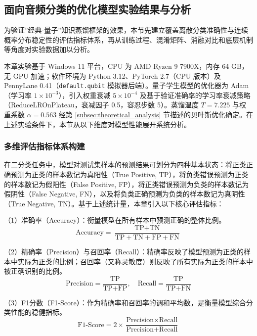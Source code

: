 \subsection{面向音频分类的优化模型实验结果与分析}
\label{sec:experimental_results}

为验证”经典-量子”知识蒸馏框架的效果，本节先建立覆盖离散分类准确性与连续概率分布稳定性的评估指标体系，再从训练过程、混淆矩阵、消融对比和底层机制等角度对实验数据加以分析。

本章实验基于 Windows 11 平台，CPU 为 AMD Ryzen 9 7900X，内存 64 GB，无 GPU 加速；软件环境为 Python 3.12、PyTorch 2.7（CPU 版本）及 PennyLane 0.41（\texttt{default.qubit} 模拟器后端）。量子学生模型的优化器为 Adam（学习率 $1\times10^{-3}$），引入权重衰减 $5\times10^{-4}$ 及基于验证准确率的学习率衰减策略（ReduceLROnPlateau，衰减因子 0.5，容忍步数 5）。蒸馏温度 $T=7.225$ 与权重系数 $\alpha=0.563$ 经第 \ref{subsec:theoretical_analysis} 节描述的贝叶斯优化确定。在上述实验条件下，本节从以下维度对模型性能展开系统分析。

\subsubsection{多维评估指标体系构建}
\label{subsec:evaluation_metrics}

在二分类任务中，模型对测试集样本的预测结果可划分为四种基本状态：将正类正确预测为正类的样本数记为真阳性（True Positive, TP），将负类错误预测为正类的样本数记为假阳性（False Positive, FP），将正类错误预测为负类的样本数记为假阴性（False Negative, FN），以及将负类正确预测为负类的样本数记为真阴性（True Negative, TN）。基于上述统计量，本章引入以下核心评估指标：

（1）准确率（Accuracy）：衡量模型在所有样本中预测正确的整体比例。
\begin{equation}
	\text{Accuracy} = \frac{\text{TP} + \text{TN}}{\text{TP} + \text{TN} + \text{FP} + \text{FN}}
\end{equation}

（2）精确率（Precision）与召回率（Recall）：精确率反映了模型预测为正类的样本中实际为正类的比例；召回率（又称灵敏度）则反映了所有实际为正类的样本中被正确识别的比例。
\begin{equation}
	\text{Precision} = \frac{\text{TP}}{\text{TP} + \text{FP}}, \quad \text{Recall} = \frac{\text{TP}}{\text{TP} + \text{FN}}
\end{equation}

（3）F1分数（F1-Score）：作为精确率和召回率的调和平均数，是衡量模型综合分类性能的稳健指标。
\begin{equation}
	\text{F1-Score} = 2 \times \frac{\text{Precision} \times \text{Recall}}{\text{Precision} + \text{Recall}}
\end{equation}

